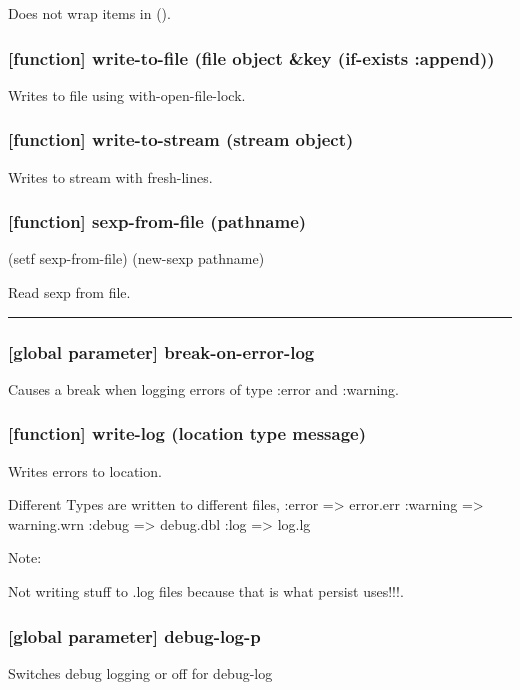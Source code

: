 \documentclass[11pt]{article}
\begin{document}
Does not wrap items in ().

\subsubsection{[function] write-to-file (file object \&key (if-exists :append))}
\label{sec:org7562f89}

Writes to file using with-open-file-lock.

\subsubsection{[function] write-to-stream (stream object)}
\label{sec:org01dd000}

Writes to stream with fresh-lines.

\subsubsection{[function] sexp-from-file (pathname)}
\label{sec:org1a807e1}
(setf sexp-from-file) (new-sexp pathname)

Read sexp from file.

\noindent\rule{\textwidth}{0.5pt}
\subsubsection{[global parameter] \textbf{break-on-error-log}}
\label{sec:org33bf28c}

Causes a break when logging errors of type :error and :warning.

\subsubsection{[function] write-log (location type message)}
\label{sec:orge4236ef}

Writes errors to location.

Different Types are written to different files,
:error => error.err
:warning => warning.wrn
:debug => debug.dbl
:log => log.lg

Note:

Not writing stuff to .log files because that is what persist uses!!!.

\subsubsection{[global parameter] \textbf{debug-log-p}}
\label{sec:orgc4c1274}

Switches debug logging or off for debug-log
\end{document}
